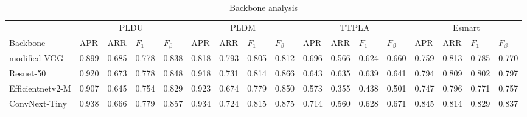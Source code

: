 \documentclass[journal]{IEEEtran}
\begin{document}

\begin{table}[]
\begin{tabular}{lllll|llll|llll|llll}
                 & \multicolumn{4}{c|}{PLDU}           & \multicolumn{4}{c|}{PLDM}           & \multicolumn{4}{c|}{TTPLA}          & \multicolumn{4}{c}{Esmart}          \\ \cline{2-17} 
Backbone         & APR   & ARR   & $F_1$ & $F_{\beta}$ & APR   & ARR   & $F_1$ & $F_{\beta}$ & APR   & ARR   & $F_1$ & $F_{\beta}$ & APR   & ARR   & $F_1$ & $F_{\beta}$ \\ \hline
modified VGG     & 0.899 & 0.685 & 0.778 & 0.838       & 0.818 & 0.793 & 0.805 & 0.812       & 0.696 & 0.566 & 0.624 & 0.660       & 0.759 & 0.813 & 0.785 & 0.770       \\
Resnet-50        & 0.920 & 0.673 & 0.778 & 0.848       & 0.918 & 0.731 & 0.814 & 0.866       & 0.643 & 0.635 & 0.639 & 0.641       & 0.794 & 0.809 & 0.802 & 0.797       \\
Efficientnetv2-M & 0.907 & 0.645 & 0.754 & 0.829       & 0.923 & 0.674 & 0.779 & 0.850       & 0.573 & 0.355 & 0.438 & 0.501       & 0.747 & 0.796 & 0.771 & 0.757       \\
ConvNext-Tiny    & 0.938 & 0.666 & 0.779 & 0.857       & 0.934 & 0.724 & 0.815 & 0.875       & 0.714 & 0.560 & 0.628 & 0.671       & 0.845 & 0.814 & 0.829 & 0.837      
\end{tabular}
\caption{\label{backbone_res_table} Backbone analysis}
\end{table}
\end{document}
